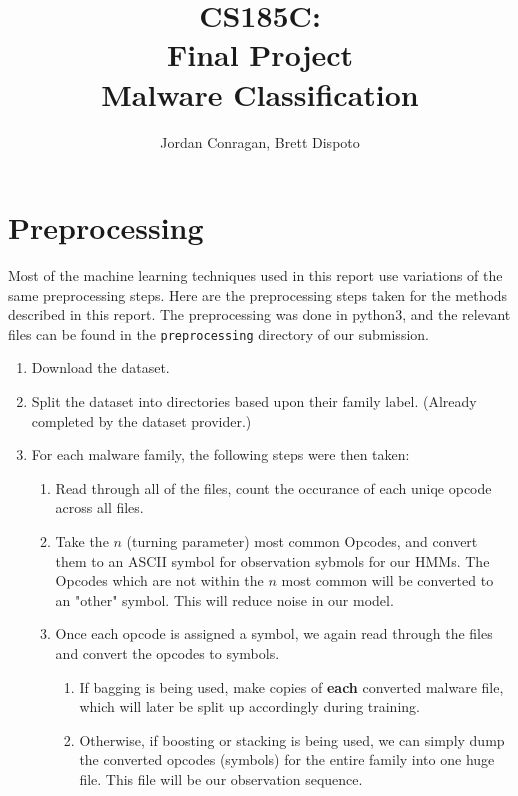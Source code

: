 \documentclass[12pt]{article}
\title{CS185C: \\ 
Final Project \\
Malware Classification}
\author{Jordan Conragan,  Brett Dispoto}
\begin{document}
\maketitle
\tableofcontents
\newpage

\section{Preprocessing}
Most of the machine learning techniques used in this report use variations of the same preprocessing steps. Here are the preprocessing steps taken for the methods described in this report. The preprocessing was done in python3, and the relevant files can be found in the \texttt{preprocessing} directory of our submission.
  \begin{enumerate}
    \item Download the dataset.
    \item Split the dataset into directories based upon their family label. (Already completed by the dataset provider.)
    \item For each malware family, the following steps were then taken:
      \begin{enumerate}
        \item Read through all of the files, count the occurance of each uniqe opcode across all files.
        \item Take the $n$ (turning parameter) most common Opcodes, and convert them to an ASCII symbol for observation sybmols for our HMMs. The Opcodes which are not within the $n$ most common will be converted to an "other" symbol. This will reduce noise in our model.
        \item Once each opcode is assigned a symbol, we again read through the files and convert the opcodes to symbols.

        \begin{enumerate}
          \item If bagging is being used, make copies of \textbf{each} converted malware file, which will later be split up accordingly during training.
          \item Otherwise, if boosting or stacking is being used, we can simply dump the converted opcodes (symbols) for the entire family into one huge file. This file will be our observation sequence.
        \end{enumerate}
      \end{enumerate}
  \end{enumerate}
\end{document}
